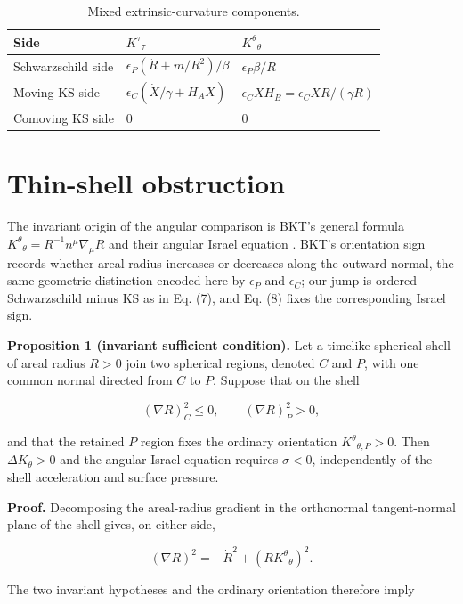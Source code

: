 \documentclass[pdflatex,sn-mathphys-num]{sn-jnl}
\begin{document}
\begin{table}[t]
\centering
\caption{Mixed extrinsic-curvature components.}
\small
\begin{tabularx}{\textwidth}{@{}XXX@{}}
\toprule
Side & \(K^\tau{}_\tau\) & \(K^\theta{}_\theta\) \\
\midrule
Schwarzschild side & \(\epsilon_P(\ddot R+m/R^2)/\beta\) & \(\epsilon_P\beta/R\) \\
Moving KS side & \(\epsilon_C(\dot X/\gamma+H_AX)\) & \(\epsilon_CXH_B=\epsilon_CX\dot R/(\gamma R)\) \\
Comoving KS side & \(0\) & \(0\) \\
\bottomrule
\end{tabularx}
\end{table}

\section{Thin-shell obstruction}

The invariant origin of the angular comparison is BKT's general formula \(K^\theta{}_\theta=R^{-1}n^\mu\nabla_\mu R\) and their angular Israel equation \cite[p.~2925, Eqs.~(2.54a) and (2.59a)]{ref2}. BKT's orientation sign records whether areal radius increases or decreases along the outward normal, the same geometric distinction encoded here by \(\epsilon_P\) and \(\epsilon_C\); our jump is ordered Schwarzschild minus KS as in Eq. (7), and Eq. (8) fixes the corresponding Israel sign.


\textbf{Proposition 1 (invariant sufficient condition).} Let a timelike spherical shell of areal radius \(R>0\) join two spherical regions, denoted \(C\) and \(P\), with one common normal directed from \(C\) to \(P\). Suppose that on the shell


\[
(\nabla R)^2_C\le0,
\qquad
(\nabla R)^2_P>0,
\]

and that the retained \(P\) region fixes the ordinary orientation \(K^\theta{}_{\theta,P}>0\). Then \(\Delta K_\theta>0\) and the angular Israel equation requires \(\sigma<0\), independently of the shell acceleration and surface pressure.


\textbf{Proof.} Decomposing the areal-radius gradient in the orthonormal tangent-normal plane of the shell gives, on either side,


\[
(\nabla R)^2=-\dot R^2+\left(RK^\theta{}_{\theta}\right)^2.
\]

The two invariant hypotheses and the ordinary orientation therefore imply
\end{document}
